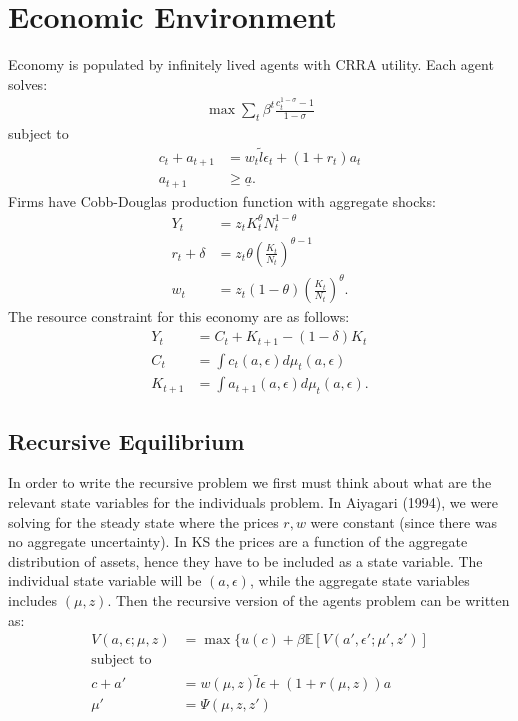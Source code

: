 \documentclass[12pt]{article}
\begin{document}
\section{Economic Environment}
Economy is populated by infinitely lived agents with CRRA utility. Each agent solves:
\begin{align*}
\max \sum_t \beta^t \frac{c_t^{1-\sigma}-1}{1-\sigma}
\end{align*}
subject to 
\begin{align*}
c_t + a_{t+1} & = w_t \tilde{l}\epsilon_t + (1+r_t)a_t\\
a_{t+1} & \geq \underline{a}.
\end{align*}
Firms have Cobb-Douglas production function with aggregate shocks:
\begin{align*}
Y_t & = z_t K_t^{\theta}N_t^{1-\theta} \\
r_t + \delta & = z_t \theta (\frac{K_t}{N_t})^{\theta -1} \\
w_t & = z_t (1-\theta) (\frac{K_t}{N_t})^{\theta}.
\end{align*} 
The resource constraint for this economy are as follows:
\begin{align*}
Y_t  & = C_t + K_{t+1} -(1-\delta)K_t \\
C_t & = \int c_t(a, \epsilon) d\mu_t(a, \epsilon)\\
K_{t+1} & = \int a_{t+1}(a, \epsilon) d\mu_t(a, \epsilon).
\end{align*}

\subsection{Recursive Equilibrium}
In  order to write the recursive problem we first must think about what are the relevant state variables for the individuals problem. In Aiyagari (1994), we were solving for the steady state where the prices $r, w$ were constant (since there was no aggregate uncertainty). In KS the prices are a function of the aggregate distribution of assets, hence they have to be included as a state variable. The individual state variable will be $(a, \epsilon)$, while the aggregate state variables includes $(\mu, z).$ Then the recursive version of the agents problem can be written as:
\begin{align*}
V(a, \epsilon; \mu, z) & = \max \{ u(c) + \beta \mathbb{E}[V(a', \epsilon'; \mu', z')] \\
\text{subject to} \\
c + a' & = w(\mu, z)\tilde{l}\epsilon + (1 + r(\mu, z))a \\
\mu' & = \Psi(\mu, z, z')
\end{align*}
\end{document}
